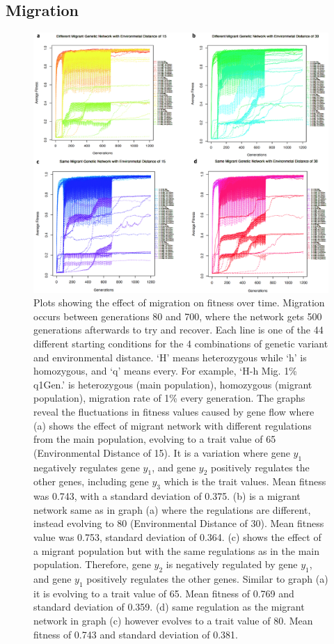 \subsection{Migration}
\begin{figure}[h]
    \centering
        \includegraphics[scale=0.45]{../Results/migration.jpg}
    \caption{Plots showing the effect of migration on fitness over time. Migration occurs between generations 80 and 700, where the network gets 500 generations afterwards to try and recover. Each line is one of the 44 different starting conditions for the 4 combinations of genetic variant and environmental distance. ‘H’ means heterozygous while ‘h’ is homozygous, and ‘q’ means every. For example, ‘H-h Mig. 1\% q1Gen.’ is heterozygous (main population), homozygous (migrant population), migration rate of 1\% every generation. The graphs reveal the fluctuations in fitness values caused by gene flow where (a) shows the effect of migrant network with different regulations from the main population, evolving to a trait value of 65 (Environmental Distance of 15). It is a variation where gene $y_1$ negatively regulates gene $y_1$, and gene $y_2$ positively regulates the other genes, including gene $y_3$ which is the trait values. Mean fitness was 0.743, with a standard deviation of 0.375. (b) is a migrant network same as in graph (a) where the regulations are different, instead evolving to 80 (Environmental Distance of 30). Mean fitness value was 0.753, standard deviation of 0.364. (c) shows the effect of a migrant population but with the same regulations as in the main population. Therefore, gene $y_2$ is negatively regulated by gene $y_1$, and gene $y_1$ positively regulates the other genes. Similar to graph (a) it is evolving to a trait value of 65. Mean fitness of 0.769 and standard deviation of 0.359. (d) same regulation as the migrant network in graph (c) however evolves to a trait value of 80. Mean fitness of 0.743 and standard deviation of 0.381.}
    \label{fig:With Migration}
\end{figure}
